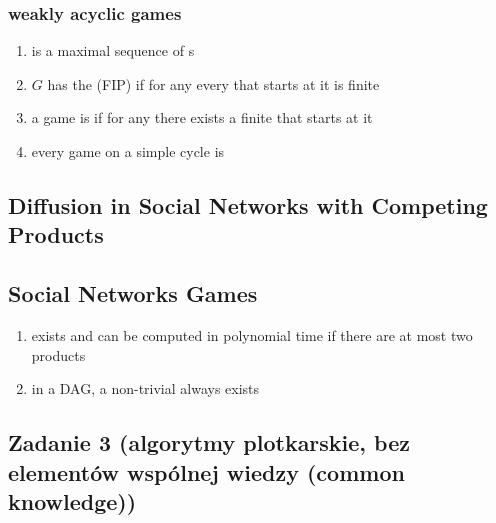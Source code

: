 \subsubsection{weakly acyclic games}

\begin{enumerate}
  \item
    is a maximal sequence of
    s
  \item
    $G$ has the
    (FIP) if for any
    every
    that starts at it is finite

  \item
    a game is
    if for any
    there exists a finite
    that starts at it

  \item
    every game on a simple cycle is



\end{enumerate}

\subsection{Diffusion in Social Networks with Competing Products}

\subsection{Social Networks Games}

\begin{enumerate}
  \item
    exists and can be computed in polynomial time if there are at most two products
  \item
    in a DAG, a non-trivial
    always exists
\end{enumerate}

\subsection{Zadanie 3 (algorytmy plotkarskie, bez elementów wspólnej wiedzy (common knowledge))}

